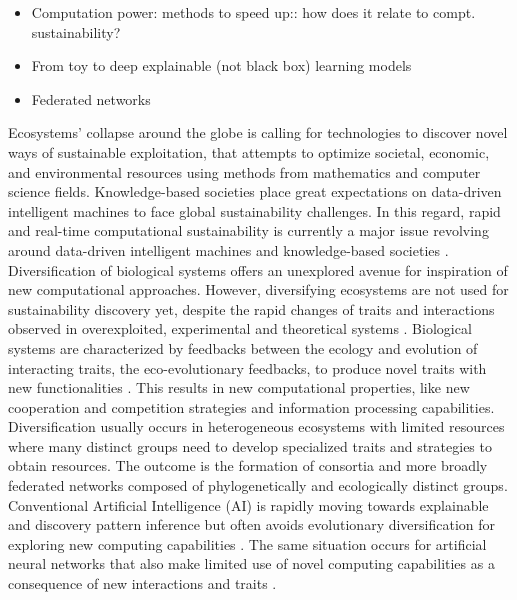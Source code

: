 \documentclass[12pt,a4paper]{article}
\begin{document}
\begin{itemize}
    \item Computation power: methods to speed up:: how does it relate to compt. sustainability?
    \item From toy to deep explainable (not black box) learning models
    \item Federated networks
    \end{itemize}
Ecosystems’ collapse around the globe is calling for technologies to discover novel ways of sustainable exploitation, that attempts to optimize societal, economic, and environmental resources using methods from mathematics and computer science fields. Knowledge-based societies place great expectations on data-driven intelligent machines to face global sustainability challenges. In this regard, rapid and real-time computational sustainability is currently a major issue revolving around data-driven intelligent machines and knowledge-based societies \cite{Gomesetal2019}. Diversification of biological systems offers an unexplored avenue for inspiration of new computational approaches. However, diversifying ecosystems are not used for sustainability discovery yet, despite the rapid changes of traits and interactions observed in overexploited, experimental and theoretical systems \cite{Hairston2005,Walsh2006,Fussmann2007,Trugman8532}. Biological systems are characterized by feedbacks between the ecology and evolution of interacting traits, the eco-evolutionary feedbacks, to produce novel traits with new functionalities \cite{Govaertetal2019}. This results in new computational properties, like new cooperation and competition strategies and information processing capabilities. Diversification usually occurs in heterogeneous ecosystems with limited resources where many distinct groups need to develop specialized traits and strategies to obtain resources. The outcome is the formation of consortia and more broadly federated networks composed of phylogenetically and ecologically distinct groups. Conventional Artificial Intelligence (AI) is rapidly moving towards explainable and discovery pattern inference \cite{Iten2020a} but often avoids evolutionary diversification for exploring new computing capabilities \cite{Real2020}. The same situation occurs for artificial neural networks that also make limited use of novel computing capabilities as a consequence of new interactions and traits \cite{Schmidhuber:2015}.

\end{document}
